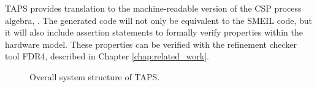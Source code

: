 TAPS provides translation to the machine-readable version of the CSP process algebra, \cspm{}. The generated \cspm{} code will not only be equivalent to the SMEIL code, but it will also include assertion statements to formally verify properties within the hardware model. These properties can be verified with the \cspm{} refinement checker tool FDR4, described in Chapter \ref{chap:related_work}.
\begin{figure}[!ht]
  \centering
  \caption{Overall system structure of TAPS.}
  \label{fig:simple_TAPS_network}
\end{figure}